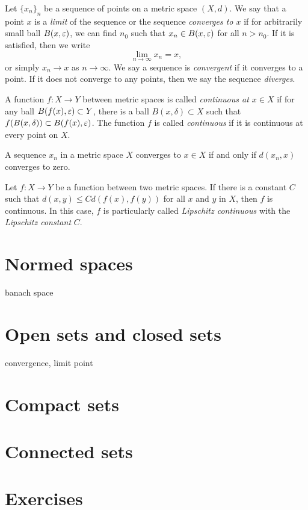 \documentclass{../note}
\begin{document}
\begin{prb}
Let $\{x_n\}_n$ be a sequence of points on a metric space $(X,d)$.
We say that a point $x$ is a \emph{limit} of the sequence or the sequence \emph{converges to $x$} if for arbitrarily small ball $B(x,\varepsilon)$, we can find $n_0$ such that $x_n\in B(x,\varepsilon)$ for all $n>n_0$.
If it is satisfied, then we write
\[\lim_{n\to\infty}x_n=x,\]
or simply $x_n\to x$ as $n\to\infty$.
We say a sequence is \emph{convergent} if it converges to a point.
If it does not converge to any points, then we say the sequence \emph{diverges}.

A function $f:X\to Y$ between metric spaces is called \emph{continuous at $x\in X$} if for any ball $B(f(x),\varepsilon)\subset Y$, there is a ball $B(x,\delta)\subset X$ such that $f(B(x,\delta))\subset B(f(x),\varepsilon)$.
The function $f$ is called \emph{continuous} if it is continuous at every point on $X$.
\begin{parts}
\item A sequence $x_n$ in a metric space $X$ converges to $x\in X$ if and only if $d(x_n,x)$ converges to zero.
\item 
Let $f:X\to Y$ be a function between two metric spaces.
If there is a constant $C$ such that $d(x,y)\le Cd(f(x),f(y))$ for all $x$ and $y$ in $X$, then $f$ is continuous.
In this case, $f$ is particularly called \emph{Lipschitz continuous} with the \emph{Lipschitz constant} $C$.
\end{parts}
\end{prb}


\section{Normed spaces}
banach space

\section{Open sets and closed sets}
convergence, limit point
\section{Compact sets}
\section{Connected sets}



\section*{Exercises}
\end{document}

